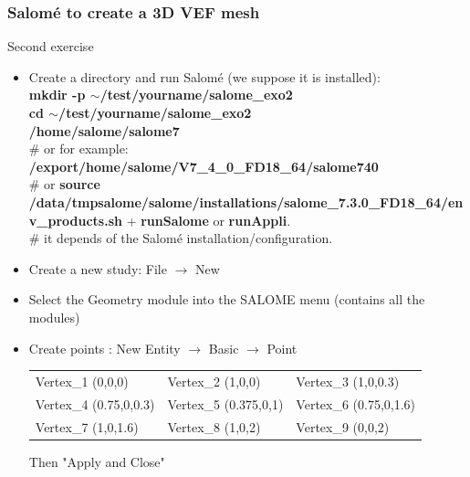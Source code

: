 \documentclass[10pt]{beamer}
\begin{document}
\begin{frame}
\frametitle{Salom\'e to create a 3D VEF mesh}
\begin{block}{Second exercise}

\begin{itemize}
\item Create a directory and run Salom\'e (we suppose it is installed):\\
\textbf{mkdir -p $\sim$/test/yourname/salome\_exo2} \\
\textbf{cd $\sim$/test/yourname/salome\_exo2} \\
\textbf{/home/salome/salome7} \\
\# or for example: {\scriptsize{\textbf{/export/home/salome/V7\_4\_0\_FD18\_64/salome740}}} \\
\# or {\scriptsize{\textbf{source /data/tmpsalome/salome/installations/salome\_7.3.0\_FD18\_64/env\_products.sh} + \textbf{runSalome} or \textbf{runAppli}.}} \\
\# it depends of the Salom\'e installation/configuration.

\item Create a new study: File $\rightarrow$ New

\item Select the Geometry module into the SALOME menu (contains all the modules)

\item Create points : New Entity $\rightarrow$ Basic $\rightarrow$ Point\\
\begin{tabular}{lll}
Vertex\_1 (0,0,0)       &   Vertex\_2 (1,0,0)       &   Vertex\_3 (1,0,0.3) \tabularnewline
Vertex\_4 (0.75,0,0.3)  &   Vertex\_5 (0.375,0,1)   &   Vertex\_6 (0.75,0,1.6) \tabularnewline
Vertex\_7 (1,0,1.6)     &   Vertex\_8 (1,0,2)       &   Vertex\_9 (0,0,2) \tabularnewline
\end{tabular}

Then "Apply and Close"

\end{itemize}

\end{block}
\end{frame}
\end{document}
